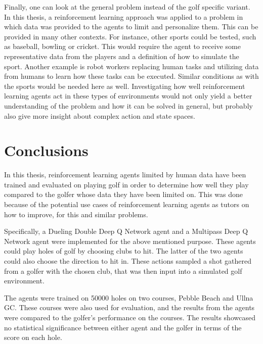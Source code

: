 \documentclass{kththesis}
\begin{document}
Finally, one can look at the general problem instead of the golf specific variant. In this thesis, a reinforcement learning approach was applied to a problem in which data was provided to the agents to limit and personalize them. This can be provided in many other contexts. For instance, other sports could be tested, such as baseball, bowling or cricket. This would require the agent to receive some representative data from the players and a definition of how to simulate the sport. Another example is robot workers replacing human tasks and utilizing data from humans to learn how these tasks can be executed. Similar conditions as with the sports would be needed here as well. Investigating how well reinforcement learning agents act in these types of environments would not only yield a better understanding of the problem and how it can be solved in general, but probably also give more insight about complex action and state spaces.

\chapter{Conclusions}
\label{chapter:conclusions}
In this thesis, reinforcement learning agents limited by human data have been trained and evaluated on playing golf in order to determine how well they play compared to the golfer whose data they have been limited on. This was done because of the potential use cases of reinforcement learning agents as tutors on how to improve, for this and similar problems.

Specifically, a Dueling Double Deep Q Network agent and a Multipass Deep Q Network agent were implemented for the above mentioned purpose. These agents could play holes of golf by choosing clubs to hit. The latter of the two agents could also choose the direction to hit in. These actions sampled a shot gathered from a golfer with the chosen club, that was then input into a simulated golf environment. 

The agents were trained on 50000 holes on two courses, Pebble Beach and Ullna GC. These courses were also used for evaluation, and the results from the agents were compared to the golfer's performance on the courses. The results showcased no statistical significance between either agent and the golfer in terms of the score on each hole.
\end{document}
